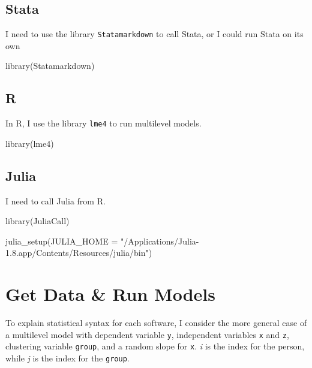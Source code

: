 \documentclass[
  letterpaper,
  DIV=11,
  numbers=noendperiod,
  oneside]{scrreprt}
\newenvironment{Shaded}{\begin{snugshade}}{\end{snugshade}}
\newcommand{\AttributeTok}[1]{\textcolor[rgb]{0.40,0.45,0.13}{#1}}
\newcommand{\FunctionTok}[1]{\textcolor[rgb]{0.28,0.35,0.67}{#1}}
\newcommand{\NormalTok}[1]{\textcolor[rgb]{0.00,0.23,0.31}{#1}}
\newcommand{\StringTok}[1]{\textcolor[rgb]{0.13,0.47,0.30}{#1}}
\begin{document}
\subsection{Stata}

I need to use the library \texttt{Statamarkdown} to call Stata, or I
could run Stata on its own

\begin{Shaded}
\begin{Highlighting}[]
\FunctionTok{library}\NormalTok{(Statamarkdown)}
\end{Highlighting}
\end{Shaded}

\subsection{R}

In R, I use the library \texttt{lme4} to run multilevel models.

\begin{Shaded}
\begin{Highlighting}[]
\FunctionTok{library}\NormalTok{(lme4) }
\end{Highlighting}
\end{Shaded}

\subsection{Julia}

I need to call Julia from R.

\begin{Shaded}
\begin{Highlighting}[]
\FunctionTok{library}\NormalTok{(JuliaCall)}

\FunctionTok{julia\_setup}\NormalTok{(}\AttributeTok{JULIA\_HOME =} \StringTok{"/Applications/Julia{-}1.8.app/Contents/Resources/julia/bin"}\NormalTok{)}
\end{Highlighting}
\end{Shaded}

\hypertarget{get-data-run-models}{%
\section{Get Data \& Run Models}\label{get-data-run-models}}

To explain statistical syntax for each software, I consider the more
general case of a multilevel model with dependent variable \texttt{y},
independent variables \texttt{x} and \texttt{z}, clustering variable
\texttt{group}, and a random slope for \texttt{x}. \emph{i} is the index
for the person, while \emph{j} is the index for the \texttt{group}.
\end{document}
